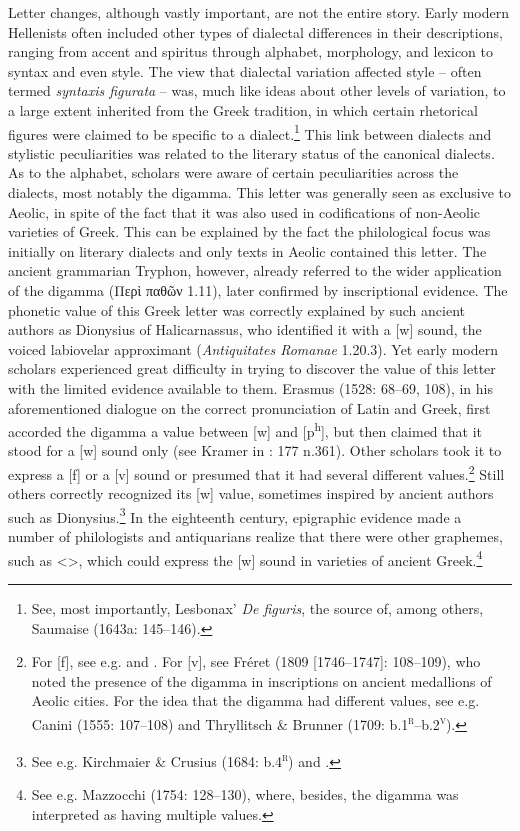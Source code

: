 Letter changes, although vastly important, are not the entire story. Early modern Hellenists often included other types of dialectal differences in their descriptions, ranging from accent and spiritus through alphabet, morphology, and lexicon to syntax and even style. The view that dialectal variation affected style – often termed \textit{syntaxis figurata} – was, much like ideas about other levels of variation, to a large extent inherited from the Greek tradition, in which certain rhetorical figures were claimed to be specific to a dialect.\footnote{{See, most importantly, Lesbonax’} {\textit{De figuris}}{, the source of, among others, Saumaise (1643a: 145–146).}} This link between dialects and stylistic peculiarities was related to the literary status of the canonical dialects. As to the alphabet, scholars were aware of certain peculiarities across the dialects, most notably the digamma. This letter was generally seen as exclusive to Aeolic, in spite of the fact that it was also used in codifications of non-Aeolic varieties of Greek. This can be explained by the fact the philological focus was initially on literary dialects and only texts in Aeolic contained this letter. The ancient grammarian Tryphon, however, already referred to the wider application of the digamma (Περὶ παθῶν 1.11), later confirmed by inscriptional evidence. The phonetic value of this Greek letter was correctly explained by such ancient authors as Dionysius of Halicarnassus, who identified it with a [w] sound, the voiced labiovelar approximant (\textit{Antiquitates Romanae} 1.20.3). Yet early modern scholars experienced great difficulty in trying to discover the value of this letter with the limited evidence available to them. Erasmus (1528: 68–69, 108), in his aforementioned dialogue on the correct pronunciation of Latin and Greek, first accorded the digamma a value between [w] and [p\textsuperscript{h}], but then claimed that it stood for a [w] sound only (see Kramer in \citealt{Erasmus1978}: 177 n.361). Other scholars took it to express a [f] or a [v] sound or presumed that it had several different values.\footnote{{For [f], see e.g. \citet[4]{Sylvius1531} and \citet[5]{Rhenius1626}. For [v], see Fréret (1809 [1746–1747]: 108–109), who noted the presence of the digamma in inscriptions on ancient medallions of Aeolic cities. For the idea that the digamma had different values, see e.g. Canini (1555: 107–108) and Thryllitsch \& Brunner (1709: b.1}{\textsc{\textsuperscript{r}}}{–b.2}{\textsc{\textsuperscript{v}}}).} Still others correctly recognized its [w] value, sometimes inspired by ancient authors such as Dionysius.\footnote{{See e.g. Kirchmaier \& Crusius (1684: b.4}{\textsc{\textsuperscript{r}}}{) }{and \citet[19]{Reynolds1752}.}} In the eighteenth century, epigraphic evidence made a number of philologists and antiquarians realize that there were other graphemes, such as <{\sqsubset}>, which could express the [w] sound in varieties of ancient Greek.\footnote{{See e.g. Mazzocchi (1754: 128–130), where, besides, the digamma was interpreted as having multiple values.}}


